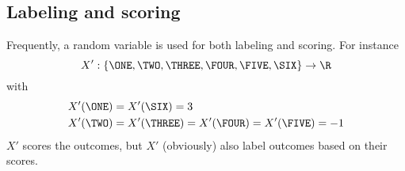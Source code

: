 \newpage
\subsection{Labeling and scoring}

Frequently,
a random variable is used for both labeling and scoring.
For instance
\[
  X' : \{ \ONE, \TWO, \THREE, \FOUR, \FIVE, \SIX \} \rightarrow \R
\]
with
\begin{align*}
  X'(\ONE) &= X'(\SIX) = 3 \\
  X'(\TWO) &= X'(\THREE) = X'(\FOUR) = X'(\FIVE) = -1 
\end{align*}
$X'$ scores the outcomes, but $X'$ (obviously)
also label outcomes based on their scores.


 
